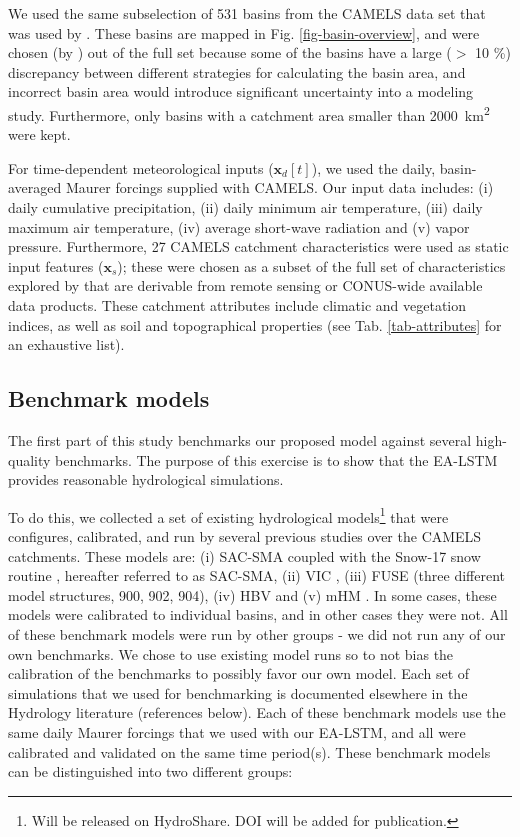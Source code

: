 We used the same subselection of 531 basins from the CAMELS data set that was used by \citet{newman2017benchmarking}. These basins are mapped in Fig. \ref{fig-basin-overview}, and were chosen (by \citet{newman2017benchmarking}) out of the full set because some of the basins have a large ($>$ 10 \%) discrepancy between different strategies for calculating the basin area, and incorrect basin area would introduce significant uncertainty into a modeling study. Furthermore, only basins with a catchment area smaller than 2000~km\textsuperscript{2} were kept.

For time-dependent meteorological inputs ($\bm{x}_d[t]$), we used the daily, basin-averaged Maurer forcings \citep{wood2002long} supplied with \gls{CAMELS}. 
Our input data includes: (i) daily cumulative precipitation, (ii) daily minimum air temperature, (iii) daily maximum air temperature, (iv) average short-wave radiation and (v) vapor pressure. Furthermore, 27 \gls{CAMELS} catchment characteristics were used as static input features ($\bm{x}_s$); these were chosen as a subset of the full set of characteristics explored by \citet{addor2017large} that are derivable from remote sensing or CONUS-wide available data products. These catchment attributes include climatic and vegetation indices, as well as soil and topographical properties (see Tab. \ref{tab-attributes} for an exhaustive list). 

\subsection{Benchmark models}\label{sec-benchmark-models}
The first part of this study benchmarks our proposed model against several high-quality benchmarks. The purpose of this exercise is to show that the \gls{EA-LSTM} provides reasonable hydrological simulations. 

To do this, we collected a set of existing hydrological models\footnote{Will be released on HydroShare. DOI will be added for publication.} that were configures, calibrated, and run by several previous studies over the CAMELS catchments. These models are: (i) SAC-SMA \citep{burnash1973generalized, burnash1995nws} coupled with the Snow-17 snow routine \citep{anderson1973national}, hereafter referred to as SAC-SMA, (ii) VIC \citep{liang1994simple}, (iii) FUSE \citep{clark2008fuse, henn2015fuse} (three different model structures, 900, 902, 904), (iv) HBV \citep{seibert2012teaching} and (v) mHM \citep{samaniego2010multiscale,kumar2013implications}. In some cases, these models were calibrated to individual basins, and in other cases they were not. All of these benchmark models were run by other groups - we did not run any of our own benchmarks. We chose to use existing model runs so to not bias the calibration of the benchmarks to possibly favor our own model. Each set of simulations that we used for benchmarking is documented elsewhere in the Hydrology literature (references below). Each of these benchmark models use the same daily Maurer forcings that we used with our \gls{EA-LSTM}, and all were calibrated and validated on the same time period(s). These benchmark models can be distinguished into two different groups:


